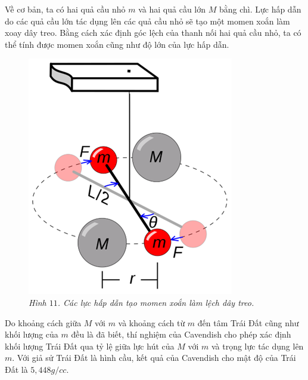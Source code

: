 \begin{multicols}{2}
\begin{figure}[H]
		\vspace*{-10pt}
	\end{figure}
	Về cơ bản, ta có hai quả cầu nhỏ $m$ và hai quả cầu lớn $M$ bằng chì. Lực hấp dẫn do các quả cầu lớn tác dụng lên các quả cầu nhỏ sẽ tạo một momen xoắn làm xoay dây treo. Bằng cách xác định góc lệch của thanh nối hai quả cầu nhỏ, ta có thể tính được momen xoắn cũng như độ lớn của lực hấp dẫn.
	\begin{figure}[H]
		\vspace*{-5pt}
		\centering
		\captionsetup{labelformat= empty, justification=centering}
		\includegraphics[width =1\linewidth]{13}
		\caption{\small\textit{\color{timhieukhoahoc}Hình $11$. Các lực hấp dẫn tạo momen xoắn làm lệch dây treo.}}
		\vspace*{-10pt}
	\end{figure}
	Do khoảng cách giữa $M$ với $m$ và khoảng cách từ $m$ đến tâm Trái Đất cũng như khối lượng của $m$ đều là đã biết, thí nghiệm của Cavendish cho phép xác định khối lượng Trái Đất qua tỷ lệ giữa lực hút của $M$ với $m$ và trọng lực tác dụng lên $m$. Với giả sử Trái Đất là hình cầu, kết quả của Cavendish cho mật độ của Trái Đất là $5{,}448 g/cc$.

\end{multicols}
